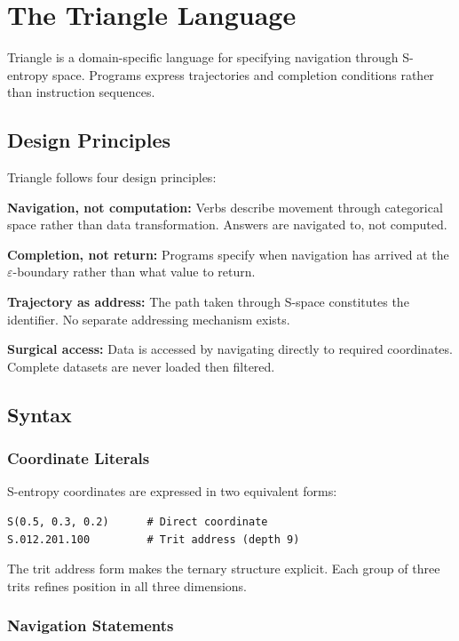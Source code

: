 \documentclass[10pt,twocolumn]{article}
\theoremstyle{definition}
\theoremstyle{remark}
\begin{document}
\section{The Triangle Language}
\label{sec:triangle}

Triangle is a domain-specific language \cite{fowler2010,mernik2005} for specifying navigation through S-entropy space. Programs express trajectories and completion conditions rather than instruction sequences.

\subsection{Design Principles}

Triangle follows four design principles:

\textbf{Navigation, not computation:} Verbs describe movement through categorical space rather than data transformation. Answers are navigated to, not computed.

\textbf{Completion, not return:} Programs specify when navigation has arrived at the $\varepsilon$-boundary rather than what value to return.

\textbf{Trajectory as address:} The path taken through S-space constitutes the identifier. No separate addressing mechanism exists.

\textbf{Surgical access:} Data is accessed by navigating directly to required coordinates. Complete datasets are never loaded then filtered.

\subsection{Syntax}

\subsubsection{Coordinate Literals}

S-entropy coordinates are expressed in two equivalent forms:
\begin{lstlisting}
S(0.5, 0.3, 0.2)      # Direct coordinate
S.012.201.100         # Trit address (depth 9)
\end{lstlisting}

The trit address form makes the ternary structure explicit. Each group of three trits refines position in all three dimensions.

\subsubsection{Navigation Statements}
\end{document}
